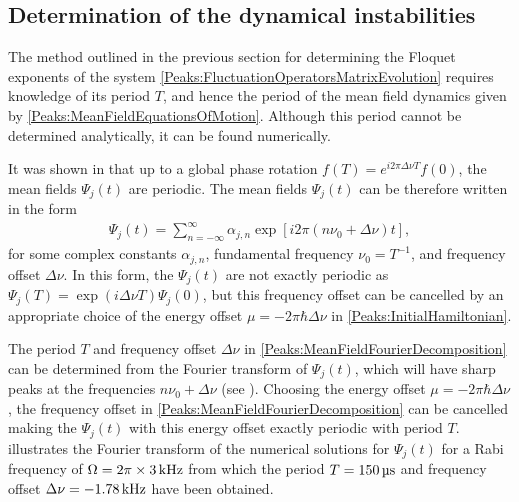 \subsection{Determination of the dynamical instabilities}
\label{Peaks:ExperimentEigenvalues}

The method outlined in the previous section for determining the Floquet exponents of the system \eqref{Peaks:FluctuationOperatorsMatrixEvolution} requires knowledge of its period $T$, and hence the period of the mean field dynamics given by \eqref{Peaks:MeanFieldEquationsOfMotion}. Although this period cannot be determined analytically, it can be found numerically.

It was shown in  that up to a global phase rotation $\displaystyle f(T) = e^{i 2\pi \Delta \nu T}f(0)$, the mean fields $\Psi_j(t)$ are periodic. The mean fields $\Psi_j(t)$ can be therefore written in the form
\begin{align}
    \label{Peaks:MeanFieldFourierDecomposition}
    \Psi_j(t) = \sum_{n=-\infty}^\infty \alpha_{j,n} \exp\left[i 2\pi \left( n \nu_0 + \Delta\nu\right)t \right],
\end{align}
for some complex constants $\alpha_{j, n}$, fundamental frequency $\nu_0 = T^{-1}$, and frequency offset $\Delta \nu$. In this form, the $\Psi_j(t)$ are not exactly periodic as $\Psi_j(T) = \exp(i\Delta \nu T)\Psi_j(0)$, but this frequency offset can be cancelled by an appropriate choice of the energy offset $\mu = -2 \pi \hbar\Delta \nu$ in \eqref{Peaks:InitialHamiltonian}.

The period $T$ and frequency offset $\Delta\nu$ in \eqref{Peaks:MeanFieldFourierDecomposition} can be determined from the Fourier transform of $\Psi_j(t)$, which will have sharp peaks at the frequencies $n \nu_0 + \Delta \nu$ (see ). Choosing the energy offset $\mu=-2 \pi \hbar \Delta\nu$, the frequency offset in \eqref{Peaks:MeanFieldFourierDecomposition} can be cancelled making the $\Psi_j(t)$ with this energy offset exactly periodic with period $T$.  illustrates the Fourier transform of the numerical solutions for $\Psi_j(t)$ for a Rabi frequency of $\Omega = 2 \pi \times \unit[3]{kHz}$ from which the period $T=\unit[150]{\micro{}s}$ and frequency offset $\Delta \nu = \unit[-1.78]{kHz}$ have been obtained.

